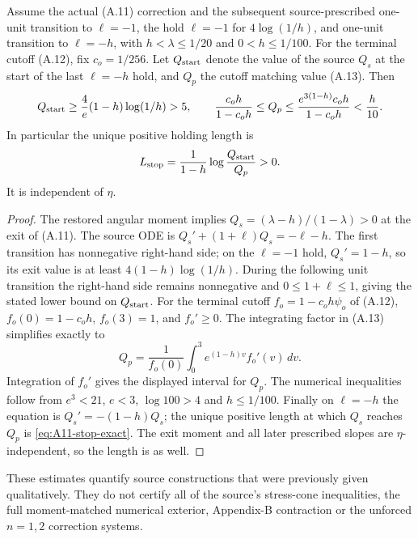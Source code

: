 \begin{proposition}
\label{prop:A11-terminal-stop}
Assume the actual (A.11) correction and the subsequent
source-prescribed one-unit transition to $\ell=-1$, the hold
$\ell=-1$ for $4\log(1/h)$, and one-unit transition to
$\ell=-h$, with $h<\lambda\le1/20$ and $0<h\le1/100$.
For the terminal cutoff (A.12), fix $c_o=1/256$.
Let $Q_{\rm start}$ denote the value of the source $Q_s$
at the start of the last $\ell=-h$ hold, and $Q_p$ the
cutoff matching value (A.13). Then
\begin{equation}\label{eq:A11-terminal-Q-bounds}
 Q_{\rm start}\ge\frac4e(1-h)\log(1/h)>5,\qquad
 \frac{c_oh}{1-c_oh}\le Q_p
 \le\frac{e^{3(1-h)}c_oh}{1-c_oh}<\frac h{10}.
\end{equation}
In particular the unique positive holding length is
\begin{equation}\label{eq:A11-stop-exact}
 L_{\rm stop}=\frac1{1-h}\log\frac{Q_{\rm start}}{Q_p}>0.
\end{equation}
It is independent of $\eta$.
\end{proposition}
\begin{proof}
The restored angular moment implies
$Q_s=(\lambda-h)/(1-\lambda)>0$ at the exit of (A.11).
The source ODE is $Q_s'+(1+\ell)Q_s=-\ell-h$.
The first transition has nonnegative right-hand side;
on the $\ell=-1$ hold, $Q_s'=1-h$, so its exit value is
at least $4(1-h)\log(1/h)$. During the following unit transition
the right-hand side remains nonnegative and $0\le1+\ell\le1$,
giving the stated lower bound on $Q_{\rm start}$.
For the terminal cutoff $f_o=1-c_oh\psi_o$ of (A.12),
$f_o(0)=1-c_oh$, $f_o(3)=1$, and $f_o'\ge0$.
The integrating factor in (A.13) simplifies exactly to
\[
 Q_p=\frac1{f_o(0)}\int_0^3e^{(1-h)v}f_o'(v)\,dv.
\]
Integration of $f_o'$ gives the displayed interval for $Q_p$.
The numerical inequalities follow from $e^3<21$, $e<3$,
$\log100>4$ and $h\le1/100$. Finally on $\ell=-h$
the equation is $Q_s'=-(1-h)Q_s$; the unique positive length
at which $Q_s$ reaches $Q_p$ is \eqref{eq:A11-stop-exact}.
The exit moment and all later prescribed slopes are
$\eta$-independent, so the length is as well.
\end{proof}

These estimates quantify source constructions that were previously
given qualitatively. They do not certify all of the source's
stress-cone inequalities, the full moment-matched numerical exterior,
Appendix-B contraction or the unforced $n=1,2$ correction systems.
